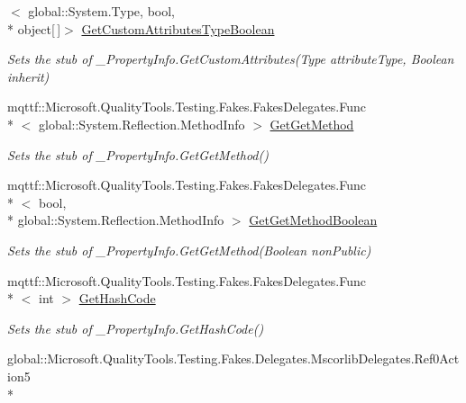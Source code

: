 \begin{DoxyCompactItemize}
$<$ global\-::\-System.\-Type, bool, \\*
object\mbox{[}$\,$\mbox{]}$>$ \hyperlink{class_system_1_1_runtime_1_1_interop_services_1_1_fakes_1_1_stub___property_info_a10a8464d5142d554ea1966391362f392}{Get\-Custom\-Attributes\-Type\-Boolean}
\begin{DoxyCompactList}\small\item\em Sets the stub of \-\_\-\-Property\-Info.\-Get\-Custom\-Attributes(\-Type attribute\-Type, Boolean inherit)\end{DoxyCompactList}\item 
mqttf\-::\-Microsoft.\-Quality\-Tools.\-Testing.\-Fakes.\-Fakes\-Delegates.\-Func\\*
$<$ global\-::\-System.\-Reflection.\-Method\-Info $>$ \hyperlink{class_system_1_1_runtime_1_1_interop_services_1_1_fakes_1_1_stub___property_info_ac24cd7b3e41925bf46ea12a09abc2981}{Get\-Get\-Method}
\begin{DoxyCompactList}\small\item\em Sets the stub of \-\_\-\-Property\-Info.\-Get\-Get\-Method()\end{DoxyCompactList}\item 
mqttf\-::\-Microsoft.\-Quality\-Tools.\-Testing.\-Fakes.\-Fakes\-Delegates.\-Func\\*
$<$ bool, \\*
global\-::\-System.\-Reflection.\-Method\-Info $>$ \hyperlink{class_system_1_1_runtime_1_1_interop_services_1_1_fakes_1_1_stub___property_info_a38968a786aecd9ce193c0f2c9ee307fe}{Get\-Get\-Method\-Boolean}
\begin{DoxyCompactList}\small\item\em Sets the stub of \-\_\-\-Property\-Info.\-Get\-Get\-Method(\-Boolean non\-Public)\end{DoxyCompactList}\item 
mqttf\-::\-Microsoft.\-Quality\-Tools.\-Testing.\-Fakes.\-Fakes\-Delegates.\-Func\\*
$<$ int $>$ \hyperlink{class_system_1_1_runtime_1_1_interop_services_1_1_fakes_1_1_stub___property_info_a22bfc5890bc77f82cffc526e4bfe1b03}{Get\-Hash\-Code}
\begin{DoxyCompactList}\small\item\em Sets the stub of \-\_\-\-Property\-Info.\-Get\-Hash\-Code()\end{DoxyCompactList}\item 
global\-::\-Microsoft.\-Quality\-Tools.\-Testing.\-Fakes.\-Delegates.\-Mscorlib\-Delegates.\-Ref0\-Action5\\*

\end{DoxyCompactItemize}
